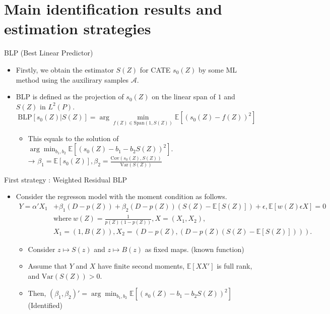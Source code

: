 \documentclass[xcolor=svgnames,aspectratio=169]{beamer}
\newcommand{\E}{\mathbb{E}}
\newcommand{\cov}{\text{Cov}}
\newcommand{\var}{\text{Var}}
\begin{document}
\section{Main identification results and estimation strategies}

\begin{frame}{BLP (Best Linear Predictor)}
    \begin{itemize}
        \item Firstly, we obtain the estimator $S(Z)$ for CATE $s_0(Z)$ by some ML method using the auxilirary samples $\mathcal{A} $.
        \item BLP is defined as the projection of $s_0(Z)$ on the linear span of $1$ and $S(Z)$ in $L^2(P)$.
        \[
        \text{BLP}[s_0(Z)|S(Z)]=\arg\min_{f(Z)\in \text{Span}(1,S(Z))}\E[(s_0(Z)-f(Z))^2]
        \]
        \begin{itemize}
            \item This equals to the solution of $\arg\min_{b_1,b_2}\E[(s_0(Z)-b_1-b_2 S(Z))^2]$. \\
            → $\beta_1=\E[s_0(Z)], \beta_2=\frac{\cov(s_0(Z),S(Z))}{\var(S(Z))}$
        \end{itemize}

    \end{itemize}
\end{frame}

\begin{frame}{First strategy : Weighted Residual BLP}
    \begin{itemize}
        \item Consider the regresson model with the moment condition as follows.
        \begin{align*}
            Y=\alpha'X_1&+\beta_1(D-p(Z))+\beta_2(D-p(Z))(S(Z)-\E[S(Z)])+\epsilon, \E[w(Z)\epsilon X]=0 \\
            &\text{where} \  w(Z)=\frac{1}{p(Z)(1-p(Z))}, X=(X_1,X_2), \\ 
            &X_1=(1,B(Z)),X_2=(D-p(Z),(D-p(Z)(S(Z)-\E[S(Z)]))).
        \end{align*}
        \begin{tcolorbox}[colframe=Cyan,title=Theorem 1]
        \begin{itemize}
            \item Consider $z\mapsto S(z)$ and $z\mapsto B(z)$ as fixed maps. (known function)
            \item Assume that $Y$ and $X$ have finite second moments, $\E[XX']$ is full rank, and $\var(S(Z))>0$.
            \item Then, $(\beta_1, \beta_2)'=\arg\min_{b_1,b_2}\E[(s_0(Z)-b_1-b_2 S(Z))^2]$ (Identified)
        \end{itemize}
    \end{tcolorbox}
    \end{itemize}
\end{frame}
\end{document}
